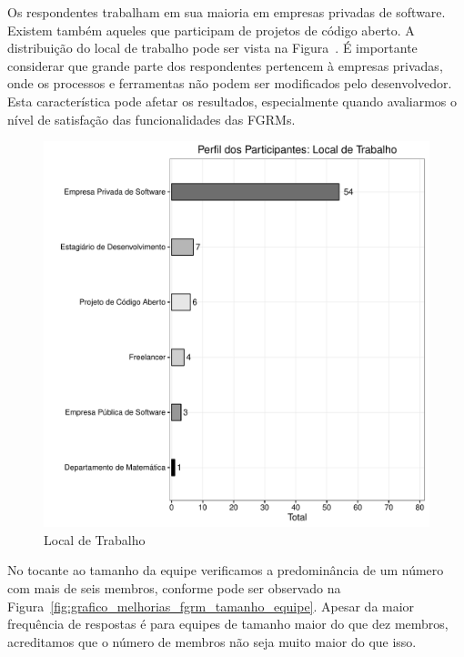 Os respondentes trabalham em sua maioria em empresas privadas de software.
Existem também aqueles que participam de projetos de código aberto. A
distribuição do local de trabalho pode ser vista na
Figura~\cite{fig:grafico_melhorias_fgrm_local_trabalho}. É importante considerar
que grande parte dos respondentes pertencem à empresas privadas, onde os
processos e ferramentas não podem ser modificados pelo desenvolvedor. Esta
característica pode afetar os resultados, especialmente quando avaliarmos o
nível de satisfação das funcionalidades das FGRMs.

\begin{figure}[htpb]
	\centering
	\includegraphics[width=0.8\linewidth]{./chapter-pesquisa-com-profissionais/img/grafico_melhorias_fgrm_local_trabalho.pdf}
	\caption{Local de Trabalho}
\label{fig:grafico_melhorias_fgrm_local_trabalho}
\end{figure}

No tocante ao tamanho da equipe verificamos a predominância de um número com
mais de seis membros, conforme pode ser observado na
Figura~\ref{fig:grafico_melhorias_fgrm_tamanho_equipe}. Apesar da maior
frequência de respostas é para equipes de tamanho maior do que dez membros,
acreditamos que o número de membros não seja muito maior do que isso.

